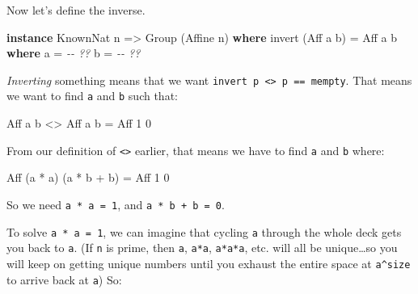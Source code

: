 \documentclass[]{article}
\newenvironment{Shaded}{}{}
\newcommand{\CommentTok}[1]{\textcolor[rgb]{0.38,0.63,0.69}{\textit{#1}}}
\newcommand{\DataTypeTok}[1]{\textcolor[rgb]{0.56,0.13,0.00}{#1}}
\newcommand{\DecValTok}[1]{\textcolor[rgb]{0.25,0.63,0.44}{#1}}
\newcommand{\KeywordTok}[1]{\textcolor[rgb]{0.00,0.44,0.13}{\textbf{#1}}}
\newcommand{\NormalTok}[1]{#1}
\newcommand{\OperatorTok}[1]{\textcolor[rgb]{0.40,0.40,0.40}{#1}}
\newcommand{\OtherTok}[1]{\textcolor[rgb]{0.00,0.44,0.13}{#1}}
\begin{document}
Now let's define the inverse.

\begin{Shaded}
\begin{Highlighting}[]
\KeywordTok{instance} \DataTypeTok{KnownNat}\NormalTok{ n }\OtherTok{=>} \DataTypeTok{Group}\NormalTok{ (}\DataTypeTok{Affine}\NormalTok{ n) }\KeywordTok{where}
\NormalTok{    invert (}\DataTypeTok{Aff}\NormalTok{ a b) }\OtherTok{=} \DataTypeTok{Aff}\NormalTok{ a\textquotesingle{} b\textquotesingle{}}
      \KeywordTok{where}
\NormalTok{        a\textquotesingle{} }\OtherTok{=} \CommentTok{{-}{-} ??}
\NormalTok{        b\textquotesingle{} }\OtherTok{=} \CommentTok{{-}{-} ??}
\end{Highlighting}
\end{Shaded}

\emph{Inverting} something means that we want
\texttt{invert\ p\ \textless{}\textgreater{}\ p\ ==\ mempty}. That means we want
to find \texttt{a\textquotesingle{}} and \texttt{b\textquotesingle{}} such that:

\begin{Shaded}
\begin{Highlighting}[]
       \DataTypeTok{Aff}\NormalTok{ a\textquotesingle{} b\textquotesingle{} }\OperatorTok{<>} \DataTypeTok{Aff}\NormalTok{ a b }\OtherTok{=} \DataTypeTok{Aff} \DecValTok{1} \DecValTok{0}
\end{Highlighting}
\end{Shaded}

From our definition of \texttt{\textless{}\textgreater{}} earlier, that means we
have to find \texttt{a\textquotesingle{}} and \texttt{b\textquotesingle{}}
where:

\begin{Shaded}
\begin{Highlighting}[]
 \DataTypeTok{Aff}\NormalTok{ (a\textquotesingle{} }\OperatorTok{*}\NormalTok{ a) (a\textquotesingle{} }\OperatorTok{*}\NormalTok{ b }\OperatorTok{+}\NormalTok{ b\textquotesingle{}) }\OtherTok{=} \DataTypeTok{Aff} \DecValTok{1} \DecValTok{0}
\end{Highlighting}
\end{Shaded}

So we need \texttt{a\textquotesingle{}\ *\ a\ =\ 1}, and
\texttt{a\textquotesingle{}\ *\ b\ +\ b\textquotesingle{}\ =\ 0}.

To solve \texttt{a\textquotesingle{}\ *\ a\ =\ 1}, we can imagine that cycling
\texttt{a} through the whole deck gets you back to \texttt{a}. (If \texttt{n} is
prime, then \texttt{a}, \texttt{a*a}, \texttt{a*a*a}, etc. will all be
unique\ldots so you will keep on getting unique numbers until you exhaust the
entire space at \texttt{a\^{}size} to arrive back at \texttt{a}) So:
\end{document}
